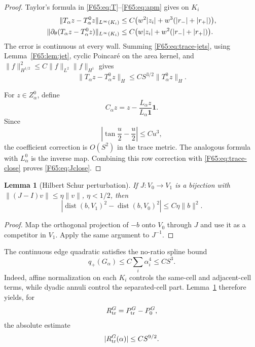 \documentclass[11pt]{amsart}
\numberwithin{equation}{section}
\newtheorem{lemma}[theorem]{Lemma}
\theoremstyle{definition}
\theoremstyle{remark}
\newcommand{\qplus}{q_+}
\begin{document}
\begin{proof}
Taylor's formula in \eqref{F65:eq:T}--\eqref{F65:eq:apm} gives on $K_i$
\begin{align}
 \|T_\alpha z-T_\alpha^0z\|_{L^\infty(K_i)}
 &\le C\bigl(w^2|z_i|+w^3(|r_-|+|r_+|)\bigr),\notag\\
 \|\partial_\theta(T_\alpha z-T_\alpha^0z)\|_{L^\infty(K_i)}
 &\le C\bigl(w|z_i|+w^2(|r_-|+|r_+|)\bigr).
 \label{F65:eq:trace-jets}
\end{align}
The error is continuous at every wall.  Summing \eqref{F65:eq:trace-jets},
using Lemma~\ref{F65:lem:jet}, cyclic Poincar\'e on the area kernel, and
$\|f\|_{H^{1/2}}^2\le C\|f\|_{L^2}\|f\|_{H^1}$ gives
\begin{equation}\label{F65:eq:trace-close}
 \|T_\alpha z-T_\alpha^0z\|_H
 \le CS^{3/2}\|T_\alpha^0z\|_H.
\end{equation}

For $z\in Z_\alpha^0$, define
\begin{equation}
 C_\alpha z=z-\frac{L_\alpha z}{L_\alpha\mathbf1}\mathbf1.
\end{equation}
Since
\begin{equation}
 \left|\tan\frac u2-\frac u2\right|\le Cu^3,
\end{equation}
the coefficient correction is $O(S^2)$ in the trace metric.  The analogous
formula with $L_\alpha^0$ is the inverse map.  Combining this row correction
with \eqref{F65:eq:trace-close} proves \eqref{F65:eq:Jclose}.
\end{proof}

\begin{lemma}[Hilbert Schur perturbation]\label{F65:lem:schur}
If $J:V_0\to V_1$ is a bijection with
$\|(J-I)v\|\le\eta\|v\|$, $\eta<1/2$, then
\begin{equation}\label{F65:eq:schur}
 \left|\operatorname {dist}(b,V_1)^2
 -\operatorname {dist}(b,V_0)^2\right|
 \le C\eta\|b\|^2.
\end{equation}
\end{lemma}

\begin{proof}
Map the orthogonal projection of $-b$ onto $V_0$ through $J$ and use it as
a competitor in $V_1$.  Apply the same argument to $J^{-1}$.
\end{proof}

The continuous edge quadratic satisfies the no-ratio spline bound
\begin{equation}\label{F65:eq:Gbound}
 \qplus(G_\alpha)\le C\sum_i\alpha_i^4\le CS^3.
\end{equation}
Indeed, affine normalization on each $K_i$ controls the same-cell and
adjacent-cell terms, while dyadic annuli control the separated-cell part.
Lemma~\ref{F65:lem:schur} therefore yields, for
\begin{equation}
 R_{\rm tr}^G=P_{\rm tr}^G-P_0^G,
\end{equation}
the absolute estimate
\begin{equation}\label{F65:eq:trace-absolute}
 |R_{\rm tr}^G(\alpha)|\le CS^{9/2}.
\end{equation}
\end{document}
